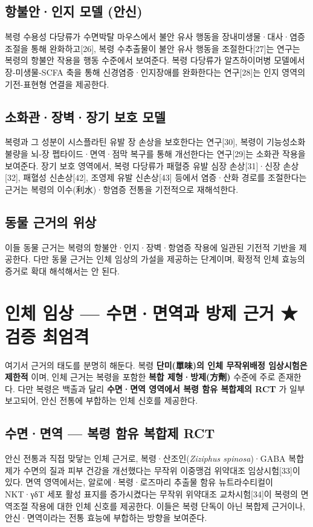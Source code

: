 \documentclass[11pt,oneside]{book}
\begin{document}
\subsection{항불안·인지 모델 (안신)}
복령 수용성 다당류가 수면박탈 마우스에서 불안 유사 행동을 장내미생물·대사·염증 조절을 통해 완화하고[26], 복령 수추출물이 불안 유사 행동을 조절한다[27]는 연구는 복령의 항불안 작용을 행동 수준에서 보여준다. 복령 다당류가 알츠하이머병 모델에서 장-미생물-SCFA 축을 통해 신경염증·인지장애를 완화한다는 연구[28]는 인지 영역의 기전-표현형 연결을 제공한다.

\subsection{소화관·장벽·장기 보호 모델}
복령과 그 성분이 시스플라틴 유발 장 손상을 보호한다는 연구[30], 복령이 기능성소화불량을 뇌-장 펩타이드·면역·점막 복구를 통해 개선한다는 연구[29]는 소화관 작용을 보여준다. 장기 보호 영역에서, 복령 다당류가 패혈증 유발 심장 손상[31]·신장 손상[32], 패혈성 신손상[42], 조영제 유발 신손상[43] 등에서 염증·산화 경로를 조절한다는 근거는 복령의 이수(利水)·항염증 전통을 기전적으로 재해석한다.

\subsection{동물 근거의 위상}
이들 동물 근거는 복령의 항불안·인지·장벽·항염증 작용에 일관된 기전적 기반을 제공한다. 다만 동물 근거는 인체 임상의 가설을 제공하는 단계이며, 확정적 인체 효능의 증거로 확대 해석해서는 안 된다.

\section{인체 임상 — 수면·면역과 방제 근거 ★검증 최엄격}
여기서 근거의 태도를 분명히 해둔다. 복령 \textbf{단미(單味)의 인체 무작위배정 임상시험은 제한적} 이며, 인체 근거는 복령을 포함한 \textbf{복합 제형·방제(方劑)} 수준에 주로 존재한다. 다만 복령은 백출과 달리 \textbf{수면·면역 영역에서 복령 함유 복합제의 RCT} 가 일부 보고되어, 안신 전통에 부합하는 인체 신호를 제공한다.

\subsection{수면·면역 — 복령 함유 복합제 RCT}
안신 전통과 직접 맞닿는 인체 근거로, 복령·산조인(\textit{Ziziphus spinosa})·GABA 복합제가 수면의 질과 피부 건강을 개선했다는 무작위 이중맹검 위약대조 임상시험[33]이 있다. 면역 영역에서는, 알로에·복령·로즈마리 추출물 함유 뉴트라수티컬이 NKT·γδT 세포 활성 표지를 증가시켰다는 무작위 위약대조 교차시험[34]이 복령의 면역조절 작용에 대한 인체 신호를 제공한다. 이들은 복령 단독이 아닌 복합제 근거이나, 안신·면역이라는 전통 효능에 부합하는 방향을 보여준다.
\end{document}
